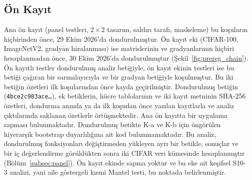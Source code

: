 \subsection{Ön Kayıt}
\label{subsec:prereg}

Ana ön kayıt (panel testleri, $2\times2$ tasarım, saldırı tarafı, maskeleme) bu koşuların hiçbirinden önce, 29 Ekim 2026'da dondurulmuştur. Ön kayıt eki (CIFAR-100, ImageNetV2, gradyan hizalanması) ise matrislerinin ve gradyanlarının hiçbiri hesaplanmadan önce, 30 Ekim 2026'da dondurulmuştur (Şekil~\ref{fig:prereg_chain}). Ön kayıtlı testler dondurulmuş analiz betiğiyle, ön kayıt ekinin testleri ise bu betiği çağıran bir sarmalayıcıyla ve bir gradyan betiğiyle koşulmuştur. Bu iki betiğin özetleri ilk koşularından önce kayda geçirilmiştir. Dondurulmuş betiğin (\texttt{4bce2c983ace\ldots}), ek betiklerin, hücre tablolarının ve iki kayıt metninin SHA-256 özetleri, dondurma anında ya da ilk koşudan önce yazılan kayıtlarla ve analiz çıktılarında saklanan özetlerle örtüşmektedir. Ana ön kayıtta bir uygulama sapması bulunmaktadır. Dondurulmuş betikte K-a ve K-b için öngörülen hiyerarşik bootstrap duyarlılığına ait kod bulunmamaktadır. Bu analiz, dondurulmuş fonksiyonları değiştirmeden yükleyen ayrı bir betikle, sonuçlar ve bir iç değerlendirme görüldükten sonra iki CIFAR veri kümesinde hesaplanmıştır (Bölüm~\ref{subsec:panel}). Ön kayıt ekinde sapma yoktur ve bu eke ait keşifsel S10-3 analizi, yani aile göstergeli kısmi Mantel testi, bu noktada belirlenmiştir.

